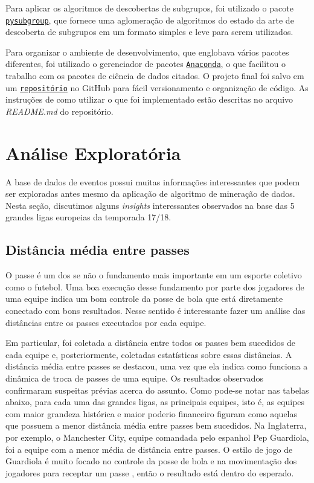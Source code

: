 \documentclass{article}
\begin{document}
Para aplicar os algoritmos de descobertas de subgrupos, foi utilizado o pacote
\href{https://pysubgroup.readthedocs.io/en/latest/}{\texttt{pysubgroup}}, que
fornece uma aglomeração de algoritmos do estado da arte de descoberta de
subgrupos em um formato simples e leve para serem utilizados.


Para organizar o ambiente de desenvolvimento, que englobava vários pacotes
diferentes, foi utilizado o gerenciador de pacotes
\href{https://www.anaconda.com/}{\texttt{Anaconda}}, o que facilitou o trabalho
com os pacotes de ciência de dados citados. O projeto final foi salvo em um
\href{https://github.com/lframosferreira/projeto-ad}{\texttt{repositório}}
no GitHub para fácil versionamento e organização de código. As instruções de
como
utilizar o que foi implementado estão descritas no arquivo \textit{README.md}
do repositório.

\section{Análise Exploratória}

A base de dados de eventos possui muitas informações interessantes que podem ser exploradas antes mesmo da aplicação
de algoritmo de mineração de dados. Nesta seção, discutimos alguns \textit{insights} interessantes observados na base das 5 grandes ligas europeias da temporada 17/18.

\subsection{Distância média entre passes}

O passe é um dos se não o fundamento mais importante em um esporte coletivo como o futebol. Uma boa execução desse fundamento por parte dos jogadores
de uma equipe indica um bom controle da posse de bola que está diretamente conectado com bons resultados. Nesse sentido é interessante fazer um análise das distâncias entre os passes
executados por cada equipe.

Em particular, foi coletada a distância entre todos os passes bem sucedidos de cada equipe e, posteriormente, coletadas estatísticas sobre essas distâncias. A distância média
entre passes se destacou, uma vez que ela indica como funciona a dinâmica de troca de passes de uma equipe. Os resultados observados confirmaram suspeitas prévias acerca do assunto.
Como pode-se notar nas tabelas abaixo, para cada uma das grandes ligas, as principais equipes, isto é, as equipes com maior grandeza histórica e maior poderio financeiro figuram como aquelas
que possuem a menor distância média entre passes bem sucedidos. Na Inglaterra, por exemplo, o Manchester City, equipe comandada pelo espanhol Pep Guardiola, foi a equipe com a menor média
de distância entre passes. O estilo de jogo de Guardiola é muito focado no controle da posse de bola e na movimentação dos jogadores para receptar um passe \cite{terzis2023pep}, então o resultado está dentro do
esperado.
\end{document}
